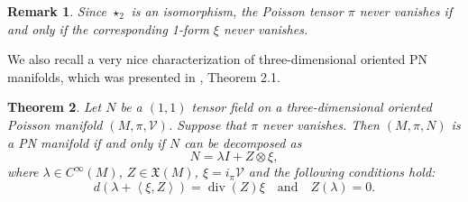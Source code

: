 \documentclass[12pt]{article}
\newtheorem{theorem}{Theorem}%
\newtheorem{remark}[theorem]{Remark}
\begin{document}
\begin{remark}
\label{rem:vanish-xi-pi}
Since $\star_2$ is an isomorphism, the Poisson tensor $\pi$ never vanishes if and only if the corresponding 1-form $\xi$ never vanishes.
\end{remark}

We also recall a very nice characterization of three-dimensional oriented PN manifolds, which was presented in \cite{Cheng-Sheng}, Theorem 2.1. 


\begin{theorem}\label{theo:charN}
Let $N$ be a $(1,1)$ tensor field on a three-dimensional oriented Poisson manifold $(M,\pi,\mathcal V)$. Suppose that $\pi$ never vanishes.
Then $(M,\pi,N)$ is a PN manifold if and only if $N$ can be decomposed as 
\begin{equation}
N=\lambda I+Z\otimes\xi,\label{eq:chPN}
\end{equation}
where $\lambda\in C^\infty(M)$, $Z\in\mathfrak X(M)$, $\xi=i_\pi\mathcal V$ and the following conditions hold:
\begin{equation}
d\left(\lambda+\left<\xi,Z\right>\right)=\operatorname{div}(Z)\xi\quad\text{and}\quad Z(\lambda)=0.
\label{eq:contor}
\end{equation}
\end{theorem}
\end{document}
